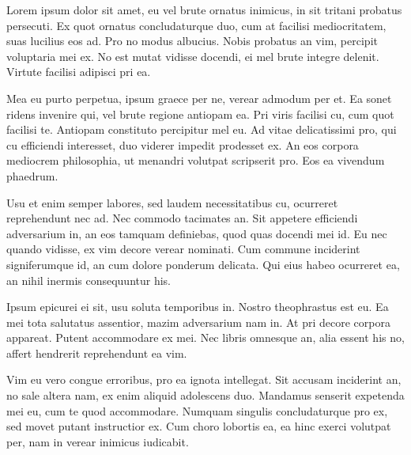 \documentclass[a4paper,11pt,twoside,notitlepage]{report}
\begin{document}
	Lorem ipsum dolor sit amet, eu vel brute ornatus inimicus, in sit tritani probatus persecuti. Ex quot ornatus concludaturque duo, cum at facilisi mediocritatem, suas lucilius eos ad. Pro no modus albucius. Nobis probatus an vim, percipit voluptaria mei ex. No est mutat vidisse docendi, ei mel brute integre delenit. Virtute facilisi adipisci pri ea.~\cite{Nobody06}

	Mea eu purto perpetua, ipsum graece per ne, verear admodum per et. Ea sonet ridens invenire qui, vel brute regione antiopam ea. Pri viris facilisi cu, cum quot facilisi te. Antiopam constituto percipitur mel eu. Ad vitae delicatissimi pro, qui cu efficiendi interesset, duo viderer impedit prodesset ex. An eos corpora mediocrem philosophia, ut menandri volutpat scripserit pro. Eos ea vivendum phaedrum.

	Usu et enim semper labores, sed laudem necessitatibus cu, ocurreret reprehendunt nec ad. Nec commodo tacimates an. Sit appetere efficiendi adversarium in, an eos tamquam definiebas, quod quas docendi mei id. Eu nec quando vidisse, ex vim decore verear nominati. Cum commune inciderint signiferumque id, an cum dolore ponderum delicata. Qui eius habeo ocurreret ea, an nihil inermis consequuntur his.

	Ipsum epicurei ei sit, usu soluta temporibus in. Nostro theophrastus est eu. Ea mei tota salutatus assentior, mazim adversarium nam in. At pri decore corpora appareat. Putent accommodare ex mei. Nec libris omnesque an, alia essent his no, affert hendrerit reprehendunt ea vim.

	Vim eu vero congue erroribus, pro ea ignota intellegat. Sit accusam inciderint an, no sale altera nam, ex enim aliquid adolescens duo. Mandamus senserit expetenda mei eu, cum te quod accommodare. Numquam singulis concludaturque pro ex, sed movet putant instructior ex. Cum choro lobortis ea, ea hinc exerci volutpat per, nam in verear inimicus iudicabit.

{}
	
\end{document}
